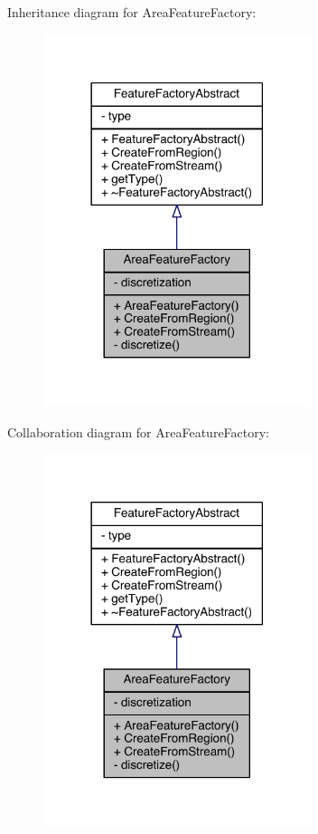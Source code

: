 Inheritance diagram for Area\+Feature\+Factory\+:\nopagebreak
\begin{figure}[H]
\begin{center}
\leavevmode
\includegraphics[width=222pt]{class_area_feature_factory__inherit__graph}
\end{center}
\end{figure}


Collaboration diagram for Area\+Feature\+Factory\+:\nopagebreak
\begin{figure}[H]
\begin{center}
\leavevmode
\includegraphics[width=222pt]{class_area_feature_factory__coll__graph}
\end{center}
\end{figure}


